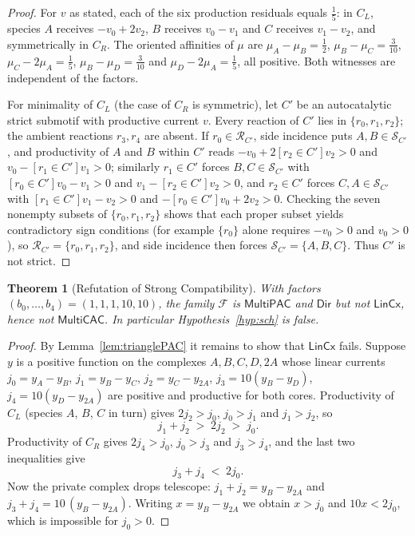 \documentclass[11pt,a4paper]{article}
\theoremstyle{plain}
\newtheorem{theorem}{Theorem}[section]
\theoremstyle{definition}
\theoremstyle{remark}
\newcommand{\cS}{\mathcal{S}}
\newcommand{\cR}{\mathcal{R}}
\newcommand{\cF}{\mathcal{F}}
\newcommand{\MPAC}{\mathsf{MultiPAC}}
\newcommand{\MCAC}{\mathsf{MultiCAC}}
\newcommand{\DIR}{\mathsf{Dir}}
\newcommand{\LIN}{\mathsf{LinCx}}
\begin{document}
\begin{proof}
For $v$ as stated, each of the six production residuals equals $\tfrac15$: in $C_L$, species $A$ receives $-v_0+2v_2$, $B$ receives $v_0-v_1$ and $C$ receives $v_1-v_2$, and symmetrically in $C_R$. The oriented affinities of $\mu$ are $\mu_A-\mu_B=\tfrac12$, $\mu_B-\mu_C=\tfrac3{10}$, $\mu_C-2\mu_A=\tfrac15$, $\mu_B-\mu_D=\tfrac3{10}$ and $\mu_D-2\mu_A=\tfrac15$, all positive. Both witnesses are independent of the factors.

For minimality of $C_L$ (the case of $C_R$ is symmetric), let $C'$ be an autocatalytic strict submotif with productive current $v$. Every reaction of $C'$ lies in $\{r_0,r_1,r_2\}$; the ambient reactions $r_3,r_4$ are absent. If $r_0\in\cR_{C'}$, side incidence puts $A,B\in\cS_{C'}$, and productivity of $A$ and $B$ within $C'$ reads $-v_0+2[r_2\in C']v_2>0$ and $v_0-[r_1\in C']v_1>0$; similarly $r_1\in C'$ forces $B,C\in\cS_{C'}$ with $[r_0\in C']v_0-v_1>0$ and $v_1-[r_2\in C']v_2>0$, and $r_2\in C'$ forces $C,A\in\cS_{C'}$ with $[r_1\in C']v_1-v_2>0$ and $-[r_0\in C']v_0+2v_2>0$. Checking the seven nonempty subsets of $\{r_0,r_1,r_2\}$ shows that each proper subset yields contradictory sign conditions (for example $\{r_0\}$ alone requires $-v_0>0$ and $v_0>0$), so $\cR_{C'}=\{r_0,r_1,r_2\}$, and side incidence then forces $\cS_{C'}=\{A,B,C\}$. Thus $C'$ is not strict.
\end{proof}

\begin{theorem}[Refutation of Strong Compatibility]\label{thm:sch}
With factors $(b_0,\dots,b_4)=(1,1,1,10,10)$, the family $\cF$ is $\MPAC$ and $\DIR$ but not $\LIN$, hence not $\MCAC$. In particular Hypothesis~\ref{hyp:sch} is false.
\end{theorem}

\begin{proof}
By Lemma~\ref{lem:trianglePAC} it remains to show that $\LIN$ fails. Suppose $y$ is a positive function on the complexes $A,B,C,D,2A$ whose linear currents $j_0=y_A-y_B$, $j_1=y_B-y_C$, $j_2=y_C-y_{2A}$, $j_3=10(y_B-y_D)$, $j_4=10(y_D-y_{2A})$ are positive and productive for both cores. Productivity of $C_L$ (species $A$, $B$, $C$ in turn) gives $2j_2>j_0$, $j_0>j_1$ and $j_1>j_2$, so
\[
 j_1+j_2 \;>\; 2j_2 \;>\; j_0 .
\]
Productivity of $C_R$ gives $2j_4>j_0$, $j_0>j_3$ and $j_3>j_4$, and the last two inequalities give
\[
 j_3+j_4 \;<\; 2j_0 .
\]
Now the private complex drops telescope: $j_1+j_2=y_B-y_{2A}$ and $j_3+j_4=10\,(y_B-y_{2A})$. Writing $x=y_B-y_{2A}$ we obtain $x>j_0$ and $10x<2j_0$, which is impossible for $j_0>0$.
\end{proof}
\end{document}
